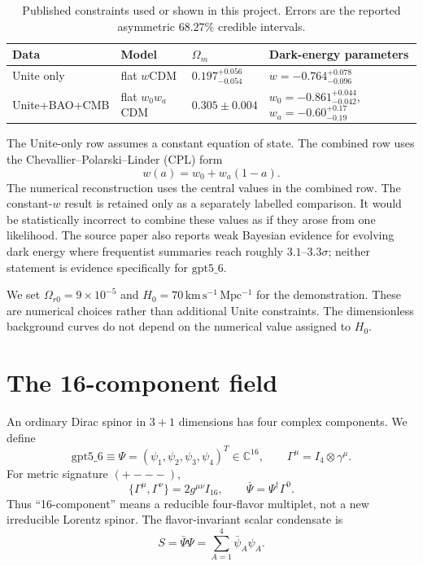 \documentclass[11pt]{article}
\newcommand{\gptfield}{\ensuremath{\mathrm{gpt5\_6}}}
\begin{document}
\begin{table}[ht]
\centering
\caption{Published constraints used or shown in this project.  Errors are the
reported asymmetric $68.27\%$ credible intervals.}
\label{tab:fits}
\begin{tabular}{@{}llll@{}}
\toprule
Data & Model & $\Omega_m$ & Dark-energy parameters \\
\midrule
Unite only & flat $w$CDM
  & $0.197^{+0.056}_{-0.054}$
  & $w=-0.764^{+0.078}_{-0.096}$ \\
Unite+BAO+CMB & flat $w_0w_a$CDM
  & $0.305\pm0.004$
  & $w_0=-0.861^{+0.044}_{-0.042}$,
    $w_a=-0.60^{+0.17}_{-0.19}$ \\
\bottomrule
\end{tabular}
\end{table}

The Unite-only row assumes a constant equation of state.  The combined row
uses the Chevallier--Polarski--Linder (CPL) form \cite{chevallier,linder}
\begin{equation}
  w(a)=w_0+w_a(1-a).
  \label{eq:cpl}
\end{equation}
The numerical reconstruction uses the central values in the combined row.  The
constant-$w$ result is retained only as a separately labelled comparison.  It
would be statistically incorrect to combine these values as if they arose from
one likelihood.  The source paper also reports weak Bayesian evidence for
evolving dark energy where frequentist summaries reach roughly
$3.1$--$3.3\sigma$; neither statement is evidence specifically for \gptfield{}.

We set $\Omega_{r0}=9\times10^{-5}$ and
$H_0=70\,\mathrm{km\,s^{-1}\,Mpc^{-1}}$ for the demonstration.  These are
numerical choices rather than additional Unite constraints.  The dimensionless
background curves do not depend on the numerical value assigned to $H_0$.

\section{The 16-component field}

An ordinary Dirac spinor in $3+1$ dimensions has four complex components.  We
define
\begin{equation}
  \gptfield\equiv\Psi=
  (\psi_1,\psi_2,\psi_3,\psi_4)^T\in\mathbb C^{16},
  \qquad
  \Gamma^\mu=I_4\otimes\gamma^\mu.
  \label{eq:field}
\end{equation}
For metric signature $(+---)$,
\begin{equation}
  \{\Gamma^\mu,\Gamma^\nu\}=2g^{\mu\nu}I_{16},
  \qquad
  \bar\Psi=\Psi^\dagger\Gamma^0.
\end{equation}
Thus ``16-component'' means a reducible four-flavor multiplet, not a new
irreducible Lorentz spinor.  The flavor-invariant scalar condensate is
\begin{equation}
  S=\bar\Psi\Psi=\sum_{A=1}^{4}\bar\psi_A\psi_A.
\end{equation}
\end{document}
